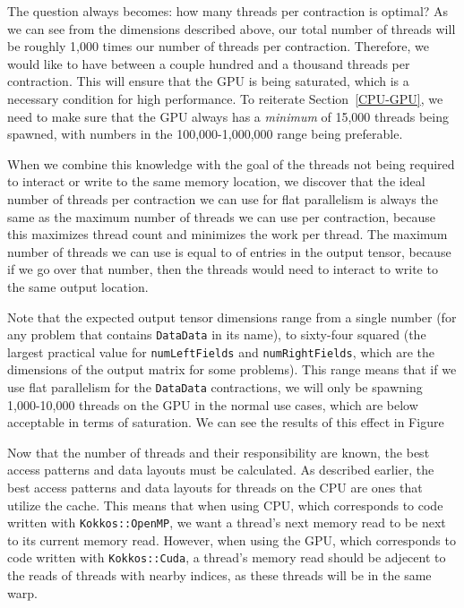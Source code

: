 The question always becomes: how many threads per contraction is optimal? 
As we can see from the dimensions described above, our total number of threads will 
be roughly 1,000 times our number of threads per contraction. Therefore, we would like
to have between a couple hundred and a thousand threads per contraction. 
This will ensure that the GPU is being saturated, which is a necessary condition for
high performance.
To reiterate Section~\ref{CPU-GPU}, we need to make sure that the GPU always has a 
\emph{minimum} of 15,000 threads being
spawned, with numbers in the 100,000-1,000,000 range being preferable.

When we combine this knowledge with the
goal of the threads not being required to interact or write to the same
memory location, we discover that the ideal number of threads per contraction we can use for flat parallelism
is always the same as the maximum number of threads we can use per contraction, because
this maximizes thread count and minimizes the work per thread. 
The maximum number of threads we can use is equal to of entries in the output tensor,
because if we go over that number, then the threads would need to interact to write
to the same output location.

Note that the
expected output tensor dimensions range from a single number (for any problem
that contains \texttt{DataData} in its name), to sixty-four squared (the largest practical value for
\texttt{numLeftFields} and \texttt{numRightFields}, which are the dimensions of the output matrix
for some problems). This range means that if we use flat parallelism for the \texttt{DataData} contractions,
we will only be spawning 1,000-10,000 threads on the GPU in the normal use cases,
which are below acceptable in terms of saturation. We can see the results of this effect in Figure~%

Now that the number of threads and their responsibility are known, the best
access patterns and data layouts must be calculated. As described earlier, the
best access patterns and data layouts for threads on the CPU are ones that
utilize the cache. This means that when using CPU, which corresponds to code written with \texttt{Kokkos::OpenMP},
we want a thread's next memory read to be next to its current memory read.
However, when using the GPU, which corresponds to code written with \texttt{Kokkos::Cuda}, a thread's memory read should
be adjecent to the reads of threads with nearby indices, as these threads will be in the same warp. 

